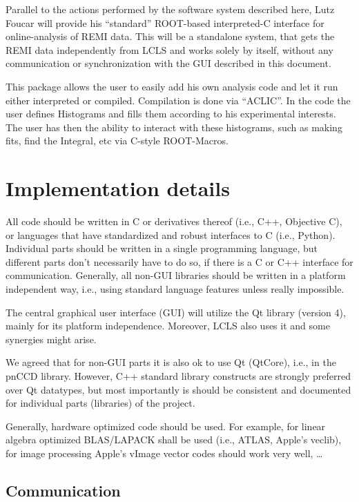 \documentclass[11pt,a4paper,twoside]{article}
\begin{document}
Parallel to the actions performed by the software system described here, Lutz Foucar will provide
his ``standard'' ROOT-based interpreted-C interface for online-analysis of REMI data. This will be a
standalone system, that gets the REMI data independently from LCLS and works solely by itself,
without any communication or synchronization with the GUI described in this document.

This package allows the user to easily add his own analysis code and let it run either interpreted
or compiled. Compilation is done via ``ACLIC''. In the code the user defines Histograms and fills
them according to his experimental interests. The user has then the ability to interact with these
histograms, such as making fits, find the Integral, etc via C-style ROOT-Macros.


\section{Implementation details}
\label{sec:implementation}

All code should be written in C or derivatives thereof (i.e., C++, Objective C), or languages that
have standardized and robust interfaces to C (i.e., Python). Individual parts should be written in a
single programming language, but different parts don't necessarily have to do so, if there is a C or
C++ interface for communication. Generally, all non-GUI libraries should be written in a platform
independent way, i.e., using standard language features unless
really impossible.

The central graphical user interface (GUI) will utilize the Qt library (version 4), mainly for its
platform independence. Moreover, LCLS also uses it and some synergies might arise.

We agreed that for non-GUI parts it is also ok to use Qt (QtCore), i.e., in the pnCCD library.
However, C++ standard library constructs are strongly preferred over Qt datatypes, but most
importantly is should be consistent and documented for individual parts (libraries) of the project.

Generally, hardware optimized code should be used. For example, for linear algebra optimized
BLAS/LAPACK shall be used (i.e., ATLAS, Apple's veclib), for image processing Apple's vImage vector
codes should work very well, \dots

\subsection{Communication}
\label{sec:communication}
\end{document}
